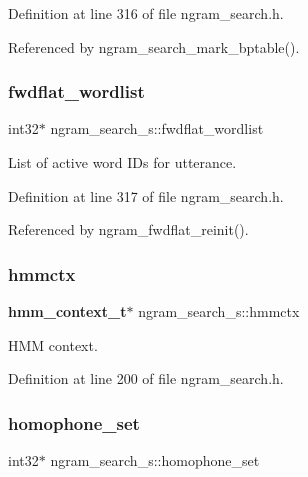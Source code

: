 Definition at line 316 of file ngram\+\_\+search.\+h.



Referenced by ngram\+\_\+search\+\_\+mark\+\_\+bptable().

\mbox{\label{structngram__search__s_a774f1640c5ece856f4bef98d98e7c959}} 
\subsubsection{fwdflat\+\_\+wordlist}
{\footnotesize\ttfamily int32$\ast$ ngram\+\_\+search\+\_\+s\+::fwdflat\+\_\+wordlist}



List of active word I\+Ds for utterance. 



Definition at line 317 of file ngram\+\_\+search.\+h.



Referenced by ngram\+\_\+fwdflat\+\_\+reinit().

\mbox{\label{structngram__search__s_acfbdd34e3dadbaa384818402f1dd59bf}} 
\subsubsection{hmmctx}
{\footnotesize\ttfamily \textbf{ hmm\+\_\+context\+\_\+t}$\ast$ ngram\+\_\+search\+\_\+s\+::hmmctx}



H\+MM context. 



Definition at line 200 of file ngram\+\_\+search.\+h.

\mbox{\label{structngram__search__s_ab251bb3d0ddd33dd99ed390b61e481f2}} 
\subsubsection{homophone\+\_\+set}
{\footnotesize\ttfamily int32$\ast$ ngram\+\_\+search\+\_\+s\+::homophone\+\_\+set}



